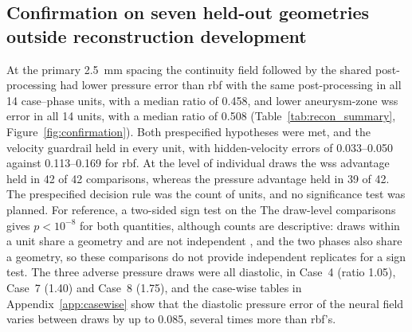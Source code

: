 \documentclass[12pt,a4paper]{article}
\newcommand{\WSS}{\ac{wss}\xspace}
\newcommand{\RBF}{\ac{rbf}\xspace}
\theoremstyle{definition}
\numberwithin{equation}{section}
\providecommand{\DIFaddtex}[1]{{\protect\color{blue} \sf #1}} %
\providecommand{\DIFdeltex}[1]{{\protect\color{red} \scriptsize #1}} %
\providecommand{\DIFaddbegin}{} %
\providecommand{\DIFaddend}{} %
\providecommand{\DIFdelbegin}{} %
\providecommand{\DIFdelend}{} %
\providecommand{\DIFadd}[1]{\texorpdfstring{\DIFaddtex{#1}}{#1}} %
\providecommand{\DIFdel}[1]{\texorpdfstring{\DIFdeltex{#1}}{}} %
\newcommand{\DIFscaledelfig}{0.5}
\newlength{\DIFdelgraphicswidth} %
\newlength{\DIFdelgraphicsheight} %
\newcommand{\DIFaddincludegraphics}[2][]{{\color{blue}\fbox{\DIFOincludegraphics[#1]{#2}}}} %
\newcommand{\DIFdelincludegraphics}[2][]{%
\sbox{\DIFdelgraphicsbox}{\DIFOincludegraphics[#1]{#2}}%
\settoboxwidth{\DIFdelgraphicswidth}{\DIFdelgraphicsbox} %
\settoboxtotalheight{\DIFdelgraphicsheight}{\DIFdelgraphicsbox} %
\scalebox{\DIFscaledelfig}{%
\parbox[b]{\DIFdelgraphicswidth}{\usebox{\DIFdelgraphicsbox}\\[-\baselineskip] \rule{\DIFdelgraphicswidth}{0em}}\llap{\resizebox{\DIFdelgraphicswidth}{\DIFdelgraphicsheight}{%
\setlength{\unitlength}{\DIFdelgraphicswidth}%
\begin{picture}(1,1)%
\thicklines\linethickness{2pt} %
{\color[rgb]{1,0,0}\put(0,0){\framebox(1,1){}}}%
{\color[rgb]{1,0,0}\put(0,0){\line( 1,1){1}}}%
{\color[rgb]{1,0,0}\put(0,1){\line(1,-1){1}}}%
\end{picture}%
}\hspace*{3pt}}} %
} %
\DeclareRobustCommand{\DIFaddbegin}{\DIFOaddbegin \let\includegraphics\DIFaddincludegraphics} %
\DeclareRobustCommand{\DIFaddend}{\DIFOaddend \let\includegraphics\DIFOincludegraphics} %
\DeclareRobustCommand{\DIFdelbegin}{\DIFOdelbegin \let\includegraphics\DIFdelincludegraphics} %
\DeclareRobustCommand{\DIFdelend}{\DIFOaddend \let\includegraphics\DIFOincludegraphics} %
\begin{document}



\subsection{Confirmation \DIFdelbegin \DIFdel{on seven held-out geometries}\DIFdelend \DIFaddbegin \DIFadd{outside reconstruction development}\DIFaddend }
\label{sec:confirmation}
At the primary 2.5~mm spacing the continuity field followed by the shared post-processing had lower pressure error than \RBF with the same post-processing in all 14 case--phase units, with a median ratio of 0.458, and lower aneurysm-zone \WSS error in all 14 units, with a median ratio of 0.508 (Table~\ref{tab:recon_summary}, Figure~\ref{fig:confirmation}). Both prespecified hypotheses were met, and the velocity guardrail held in every unit, with hidden-velocity errors of 0.033--0.050 against 0.113--0.169 for \RBF. At the level of individual draws the \WSS advantage held in 42 of 42 comparisons, whereas the pressure advantage held in 39 of 42. The prespecified decision rule was the count of units, and no significance test was planned. \DIFdelbegin \DIFdel{For reference, a two-sided sign test on the }\DIFdelend \DIFaddbegin \DIFadd{The }\DIFaddend draw-level \DIFdelbegin \DIFdel{comparisons gives $p<10^{-8}$ for both quantities, although }\DIFdelend \DIFaddbegin \DIFadd{counts are descriptive: }\DIFaddend draws within a unit share a geometry\DIFdelbegin \DIFdel{and are not independent}\DIFdelend \DIFaddbegin \DIFadd{, and the two phases also share a geometry, so these comparisons do not provide independent replicates for a sign test}\DIFaddend . The three adverse pressure draws were all diastolic, in Case~4 (ratio 1.05), Case~7 (1.40) and Case~8 (1.75), and the case-wise tables in Appendix~\ref{app:casewise} show that the diastolic pressure error of the neural field varies between draws by up to 0.085, several times more than \RBF's.


\end{document}
